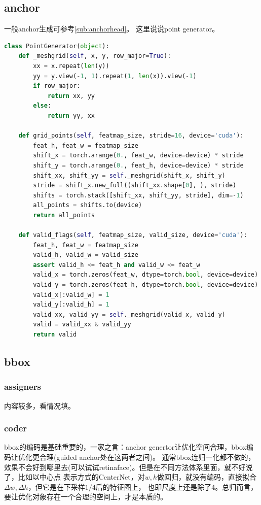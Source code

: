 \documentclass[UTF8]{ctexart}
\begin{document}
\subsection{anchor}
一般anchor生成可参考\ref{sub:anchorhead}。
这里说说point generator。
\lstset{style=mystyle}
\begin{lstlisting}[language=Python]
class PointGenerator(object):
	def _meshgrid(self, x, y, row_major=True):
		xx = x.repeat(len(y))
		yy = y.view(-1, 1).repeat(1, len(x)).view(-1)
		if row_major:
			return xx, yy
		else:
			return yy, xx

	def grid_points(self, featmap_size, stride=16, device='cuda'):
		feat_h, feat_w = featmap_size
		shift_x = torch.arange(0., feat_w, device=device) * stride
		shift_y = torch.arange(0., feat_h, device=device) * stride
		shift_xx, shift_yy = self._meshgrid(shift_x, shift_y)
		stride = shift_x.new_full((shift_xx.shape[0], ), stride)
		shifts = torch.stack([shift_xx, shift_yy, stride], dim=-1)
		all_points = shifts.to(device)
		return all_points

	def valid_flags(self, featmap_size, valid_size, device='cuda'):
		feat_h, feat_w = featmap_size
		valid_h, valid_w = valid_size
		assert valid_h <= feat_h and valid_w <= feat_w
		valid_x = torch.zeros(feat_w, dtype=torch.bool, device=device)
		valid_y = torch.zeros(feat_h, dtype=torch.bool, device=device)
		valid_x[:valid_w] = 1
		valid_y[:valid_h] = 1
		valid_xx, valid_yy = self._meshgrid(valid_x, valid_y)
		valid = valid_xx & valid_yy
		return valid
\end{lstlisting}

\subsection{bbox}
\subsubsection{assigners}
内容较多，看情况填。
\subsubsection{coder}
bbox的编码是基础重要的，一家之言：anchor genertor让优化空间合理，bbox编码让优化更合理(guided anchor处在这两者之间)。
通常bbox连归一化都不做的，效果不会好到哪里去(可以试试retinaface)。但是在不同方法体系里面，就不好说了，比如以中心点
表示方式的CenterNet，对$w, h$做回归，就没有编码，直接拟合$\Delta w, \Delta h$，但它是在下采样$1/4$后的特征图上，
也即尺度上还是除了4。总归而言，要让优化对象存在一个合理的空间上，才是本质的。
\end{document}

